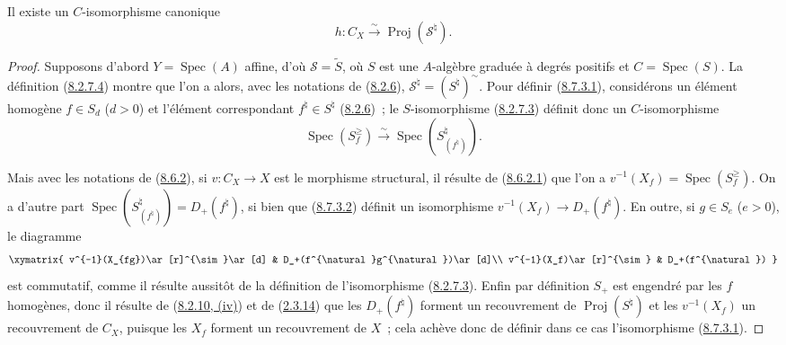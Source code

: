 \begin{proposition}[8.7.3]
\label{II.8.7.3-fr}
Il existe un $C$-isomorphisme canonique
\begin{equation}
\label{II.8.7.3.1-fr}
  h:C_X\xrightarrow{\sim}\operatorname{Proj}(\mathcal{S}^{\natural}).
\tag{8.7.3.1}
\end{equation}
\end{proposition}

\begin{proof}
Supposons d'abord $Y=\operatorname{Spec}(A)$ affine, d'où
$\mathcal{S}=\widetilde{S}$, où $S$ est une $A$-algèbre graduée à degrés
positifs et $C=\operatorname{Spec}(S)$. La définition
(\hyperref[II.8.2.6.2-fr]{8.2.7.4}) montre que l'on a alors, avec les
notations de (\hyperref[II.8.2.6-fr]{8.2.6}),
$\mathcal{S}^{\natural}=(S^{\natural})^{\sim}$. Pour définir
(\hyperref[II.8.7.3.1-fr]{8.7.3.1}), considérons un élément homogène
$f\in S_d$ ($d>0$) et l'élément correspondant $f^{\natural}\in S^{\natural}$
(\hyperref[II.8.2.6-fr]{8.2.6})~; le $S$-isomorphisme
(\hyperref[II.8.2.7.3-fr]{8.2.7.3}) définit donc un $C$-isomorphisme
\begin{equation}
\label{II.8.7.3.2-fr}
  \operatorname{Spec}(S_f^{\geqslant})
  \xrightarrow{\sim}
  \operatorname{Spec}(S_{(f^{\natural})}^{\natural}).
\tag{8.7.3.2}
\end{equation}

Mais avec les notations de (\hyperref[II.8.6.2-fr]{8.6.2}), si
$v:C_X\to X$ est le morphisme structural, il résulte de
(\hyperref[II.8.6.2.1-fr]{8.6.2.1}) que l'on a
$v^{-1}(X_f)=\operatorname{Spec}(S_f^{\geqslant})$. On a d'autre part
$\operatorname{Spec}(S_{(f^{\natural})}^{\natural})=D_+(f^{\natural})$, si
bien que (\hyperref[II.8.7.3.2-fr]{8.7.3.2}) définit un isomorphisme
$v^{-1}(X_f)\to D_+(f^{\natural})$. En outre, si $g\in S_e$ ($e>0$), le
diagramme
\[
  \xymatrix{
    v^{-1}(X_{fg})\ar[r]^{\sim}\ar[d] &
    D_+(f^{\natural}g^{\natural})\ar[d]\\
    v^{-1}(X_f)\ar[r]^{\sim} & D_+(f^{\natural})
  }
\]
est commutatif, comme il résulte aussitôt de la définition de l'isomorphisme
(\hyperref[II.8.2.7.3-fr]{8.2.7.3}). Enfin par définition $S_+$ est engendré
par les $f$ homogènes, donc il résulte de
(\hyperref[II.8.2.10-fr]{8.2.10, (iv)}) et de
(\hyperref[II.2.3.14-fr]{2.3.14}) que les $D_+(f^{\natural})$ forment un
recouvrement de $\operatorname{Proj}(S^{\natural})$ et les $v^{-1}(X_f)$ un
recouvrement de $C_X$, puisque les $X_f$ forment un recouvrement de $X$~;
cela achève donc de définir dans ce cas l'isomorphisme
(\hyperref[II.8.7.3.1-fr]{8.7.3.1}).


\end{proof}
